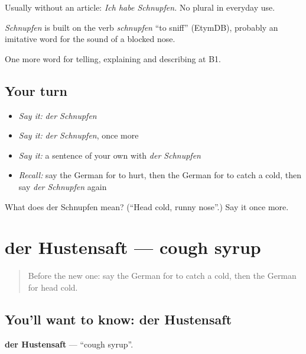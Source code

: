 Usually without an article: \emph{Ich habe Schnupfen.} No plural in everyday use.

\begin{cousinweb}
\emph{Schnupfen} is built on the verb \emph{schnupfen} \textquotedblleft{}to sniff\textquotedblright{} (EtymDB), probably an imitative word for the sound of a blocked nose.
\end{cousinweb}

\begin{grammarlens}[title={What you've built}]
One more word for telling, explaining and describing at B1.
\end{grammarlens}

\subsection*{Your turn}
\begin{itemize}
\raggedright
  \item \emph{Say it:} \emph{der Schnupfen}
  \item \emph{Say it:} \emph{der Schnupfen}, once more
  \item \emph{Say it:} a sentence of your own with \emph{der Schnupfen}
  \item \emph{Recall:} say the German for to hurt, then the German for to catch a cold, then say \emph{der Schnupfen} again
\end{itemize}

\begin{tcolorbox}[breakable,colback=teal!4,colframe=teal!35!black,title={Before you move on}]
What does der Schnupfen mean? (\textquotedblleft{}Head cold, runny nose\textquotedblright{}.) Say it once more.
\end{tcolorbox}
\section[der Hustensaft]{der Hustensaft — cough syrup}

\label{lesson:GE-C479-hustensaft}



\begin{quote}
Before the new one: say the German for to catch a cold, then the German for head cold.
\end{quote}

\subsection*{You'll want to know: der Hustensaft}
\textbf{der Hustensaft} — \textquotedblleft{}cough syrup\textquotedblright{}.


